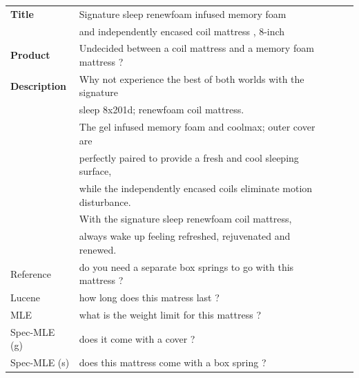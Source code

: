 \documentclass[11pt,a4paper]{article}
\begin{document}
\begin{table}[t]
\centering
\footnotesize
\begin{tabular}{l l c c}
 \toprule
  \textbf{Title} & Signature sleep renewfoam infused memory foam  \\
  & and independently encased coil mattress , 8-inch \\
\midrule
\textbf{Product} &  Undecided between a coil mattress and a memory foam mattress ?\\
\textbf{Description} &  Why not experience the best of both worlds with the signature  \\
 & sleep 8x201d; renewfoam coil mattress. \\
 & The gel infused memory foam and coolmax; outer cover are  \\
 & perfectly paired to provide a fresh and cool sleeping surface, \\
 & while the independently encased coils eliminate motion disturbance. \\
 & With the signature sleep renewfoam coil mattress, \\
 & always wake up feeling refreshed, rejuvenated and renewed.\\
\midrule
Reference & do you need a separate box springs to go with this mattress ?\\
Lucene & how long does this matress last ? \\
MLE & what is the weight limit for this mattress ?\\
Spec-MLE (g) & does it come with a cover ? \\
Spec-MLE (s) & does this mattress come with a box spring ?\\
\bottomrule


\end{tabular}
\end{table}
\end{document}
